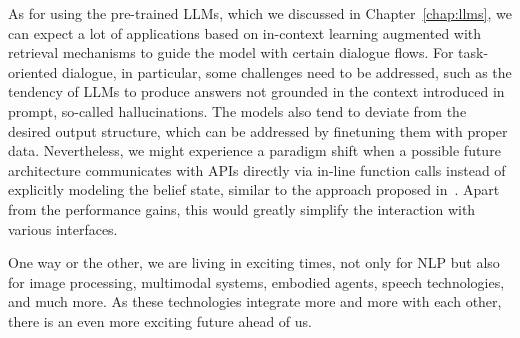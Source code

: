 As for using the pre-trained LLMs, which we discussed in Chapter~\ref{chap:llms},
we can expect a lot of applications based on in-context learning augmented with retrieval mechanisms to guide the model with certain dialogue flows.
For task-oriented dialogue, in particular, some challenges need to be addressed, such as the tendency of LLMs to produce answers not grounded in the context introduced in prompt, so-called hallucinations.
The models also tend to deviate from the desired output structure, which can be addressed by finetuning them with proper data.
Nevertheless, we might experience a paradigm shift when a possible future architecture communicates with APIs directly via in-line function calls instead of explicitly modeling the belief state, similar to the approach proposed in~\citet{schick2023toolformer}.
Apart from the performance gains, this would greatly simplify the interaction with various interfaces.

One way or the other, we are living in exciting times, not only for NLP but also for image processing, multimodal systems, embodied agents, speech technologies, and much more.
As these technologies integrate more and more with each other, there is an even more exciting future ahead of us.

